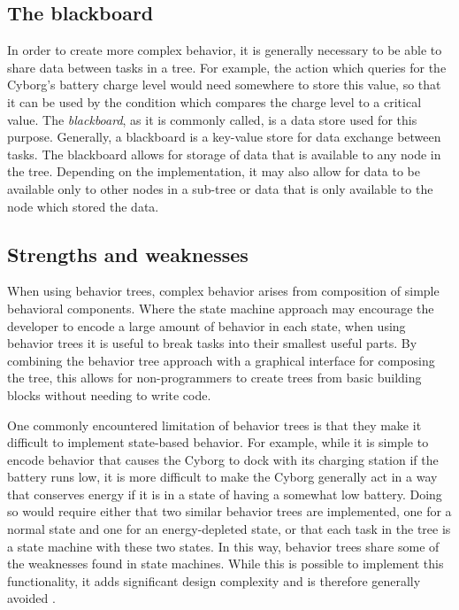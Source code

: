 \documentclass[\rootfolder/main.tex]{subfiles}
\begin{document}
\subsection{The blackboard}

In order to create more complex behavior, it is generally necessary to be able to share data between tasks in a tree.
For example, the action which queries for the Cyborg's battery charge level would need somewhere to store this value, so that it can be used by the condition which compares the charge level to a critical value.
The \emph{blackboard}, as it is commonly called, is a data store used for this purpose.
Generally, a blackboard is a key-value store for data exchange between tasks.
The blackboard allows for storage of data that is available to any node in the tree.
Depending on the implementation, it may also allow for data to be available only to other nodes in a sub-tree or data that is only available to the node which stored the data.


\subsection{Strengths and weaknesses}

When using behavior trees, complex behavior arises from composition of simple behavioral components.
Where the state machine approach may encourage the developer to encode a large amount of behavior in each state, when using behavior trees it is useful to break tasks into their smallest useful parts.
By combining the behavior tree approach with a graphical interface for composing the tree, this allows for non-programmers to create trees from basic building blocks without needing to write code.

One commonly encountered limitation of behavior trees is that they make it difficult to implement state-based behavior.
For example, while it is simple to encode behavior that causes the Cyborg to dock with its charging station if the battery runs low, it is more difficult to make the Cyborg generally act in a way that conserves energy if it is in a state of having a somewhat low battery.
Doing so would require either that two similar behavior trees are implemented, one for a normal state and one for an energy-depleted state, or that each task in the tree is a state machine with these two states.
In this way, behavior trees share some of the weaknesses found in state machines.
While this is possible to implement this functionality, it adds significant design complexity and is therefore generally avoided \cite{Millington2009}.
\end{document}
